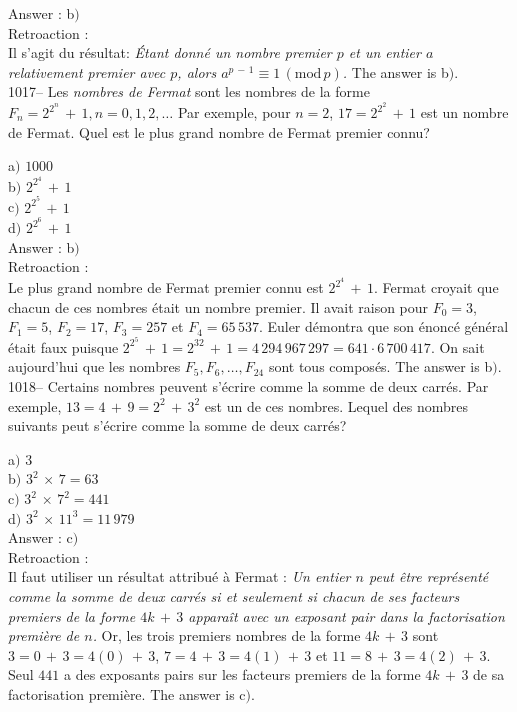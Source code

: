 ﻿\documentclass[letterpaper, 12pt]{article}
\begin{document}
Answer : b$)$\\

Retroaction : \\
Il s'agit du r\'esultat: {\sl \'Etant donn\'e un nombre premier $p$
et un entier $a$ relativement premier avec $p$, alors
$a^{p\,-\,1}\equiv1\,(\mathrm{mod}\,p)$.}
The answer is b$)$.\\

1017-- Les {\sl nombres de Fermat} sont les nombres de la forme
$F_n=2^{2^n}\,+\,1, n=0,1,2,\ldots$ Par exemple, pour $n=2$,
$17=2^{2^2}\,+\,1$ est un nombre de Fermat. Quel est le plus grand
nombre de Fermat premier connu?

a$)$ $1000$ \\
b$)$ $2^{2^4}\,+\,1$ \\
c$)$ $2^{2^5}\,+\,1$ \\
d$)$ $2^{2^6}\,+\,1$\\

Answer : b$)$\\

Retroaction : \\
Le plus grand nombre de Fermat premier connu est $2^{2^4}\,+\,1$.
Fermat croyait que chacun de ces nombres \'etait un nombre premier.
Il avait raison pour $F_0=3$, $F_1=5$, $F_2=17$, $F_3=257$ et
$F_4=65\,537$. Euler d\'emontra que son \'enonc\'e g\'en\'eral
\'etait faux puisque
$2^{2^5}\,+\,1=2^{32}\,+\,1=4\,294\,967\,297=641\cdot6\,700\,417$.
On sait aujourd'hui que les nombres $F_5,F_6,\ldots,F_{24}$ sont
tous compos\'es.
The answer is b$)$.\\

1018-- Certains nombres peuvent s'\'ecrire comme la somme de deux
carr\'es. Par exemple, $13=4\,+\,9=2^2\,+\,3^2$ est un de ces
nombres. Lequel des nombres suivants peut s'\'ecrire comme la somme
de deux carr\'es?

a$)$ $3$ \\
b$)$ $3^2\,\times\,7=63$\\
c$)$ $3^2\,\times\,7^2=441$ \\
d$)$ $3^2\,\times\,11^3=11\,979$\\

Answer : c$)$\\

Retroaction : \\
Il faut utiliser un r\'esultat attribu\'e \`a Fermat : {\sl Un
entier $n$ peut \^etre repr\'esent\'e comme la somme de deux
carr\'es si et seulement si chacun de ses facteurs premiers de la
forme $4k\,+\,3$ appara\^it avec un exposant pair dans la
factorisation premi\`ere de $n$.} Or, les trois premiers nombres de
la forme $4k\,+\,3$ sont $3=0\,+\,3=4(0)\,+\,3$,
$7=4\,+\,3=4(1)\,+\,3$ et $11=8\,+\,3=4(2)\,+\,3$. Seul $441$ a des
exposants pairs sur les facteurs premiers de la forme $4k\,+\,3$ de
sa factorisation premi\`ere.
The answer is c$)$.\\
\end{document}
